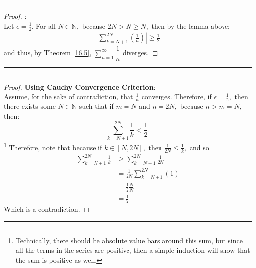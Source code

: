 \documentclass[openany, amssymb, psamsfonts]{amsart}
\newcommand{\bbN}{\mathbb{N}}
\theoremstyle{definition}
\numberwithin{equation}{section}
\begin{document}
\vspace{4pt}     \hrule   \vspace{4pt}\begin{proof}:\\
Let $\epsilon=\frac{1}{2}.$ For all $N \in \bbN,$ because $2N > N \geq N,$ then by the lemma above:
\begin{align*}
\left| \displaystyle\sum_{k = N+1}^{2N}(\frac{1}{n})\right|\geq \frac{1}{2}
\end{align*}
and thus, by Theorem \ref{16.5}, $\displaystyle \sum\limits_{n = 1}^{\infty} \dfrac{1}{n}$ diverges. 
\end{proof}\vspace{4pt}     \hrule   \vspace{4pt}
\vspace{4pt}     \hrule   \vspace{4pt}\begin{proof}\textbf{Using Cauchy Convergence Criterion}:\\
Assume, for the sake of contradiction, that $\frac{1}{n}$ converges. Therefore, if $\epsilon = \frac{1}{2},$ then there exists some $N \in \bbN$ such that if $m = N$ and $n = 2N,$ because $n>m = N,$ then: 
\[\displaystyle\sum_{k = N+1}^{2N} \frac{1}{k}< \frac{1}{2}.\]\footnote{Technically, there should be absolute value bars around this sum, but since all the terms in the series are positive, then a simple induction will show that the sum is positive as well.} Therefore, note that because if $k \in [N,2N],$ then $\frac{1}{2N}\leq \frac{1}{k},$ and so 
\begin{align*}
\displaystyle\sum_{k = N+1}^{2N} \frac{1}{k}&\geq \displaystyle\sum_{k = N+1}^{2N} \frac{1}{2N}\\
&= \frac{1}{2N}\displaystyle\sum_{k = N+1}^{2N} (1)\\
&= \frac{1}{2}\frac{N}{N}\\
&= \frac{1}{2}
\end{align*}
Which is a contradiction.
\end{proof}\vspace{4pt}     \hrule   \vspace{4pt}
\end{document}
